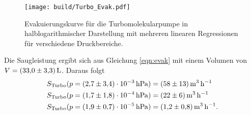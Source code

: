 \begin{figure}[H]
    \centering
    \texttt{[image: build/Turbo\_Evak.pdf]}
    \caption{Evakuierungskurve für die Turbomolekularpumpe in halblogarithmischer Darstellung mit mehreren linearen Regressionen für verschiedene Druckbereiche.}
    \label{fig:turbo_evak}
\end{figure}
\noindent
Die Saugleistung ergibt sich aus Gleichung \ref{eqn:evak} mit einem Volumen von $V=\SI{33 \pm 3.3}{\litre}$.
Daraus folgt
\begin{align*}
  S_\text{Turbo}(p=\SI{2.7\pm 3.4 e-3}{\hecto\pascal})&=\SI[per-mode=reciprocal]{58 \pm 13}{\cubic\metre\per\hour}\\
  S_\text{Turbo}(p=\SI{1.7\pm 1.8 e-4}{\hecto\pascal})&=\SI[per-mode=reciprocal]{22\pm 6}{\cubic\metre\per\hour}\\
  S_\text{Turbo}(p=\SI{1.9\pm 0.7 e-5}{\hecto\pascal})&=\SI[per-mode=reciprocal]{1.2\pm 0.8}{\cubic\metre\per\hour}.
\end{align*}
